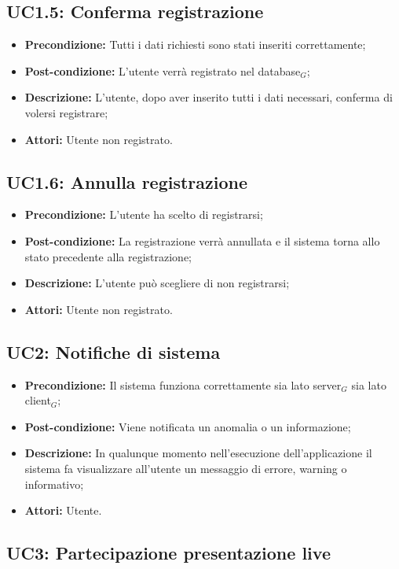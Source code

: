 \subsection{ UC1.5: Conferma registrazione}

\begin{itemize}
	\item \textbf{Precondizione:} Tutti i dati richiesti sono stati inseriti correttamente;
	\item \textbf{Post-condizione:} L'utente verrà registrato nel database$_G$;
	\item \textbf{Descrizione:} L'utente, dopo aver inserito tutti i dati necessari, conferma di volersi registrare;
	\item \textbf{Attori:} Utente non registrato.
\end{itemize}
\subsection{ UC1.6: Annulla registrazione}

\begin{itemize}
	\item \textbf{Precondizione:} L'utente ha scelto di registrarsi;
	\item \textbf{Post-condizione:} La registrazione verrà annullata e il sistema torna allo stato precedente alla registrazione;
	\item \textbf{Descrizione:} L'utente può scegliere di non registrarsi;
	\item \textbf{Attori:} Utente non registrato.
\end{itemize}
\subsection{ UC2: Notifiche di sistema}

\begin{itemize}
	\item \textbf{Precondizione:} Il sistema funziona correttamente sia lato server$_G$ sia lato client$_G$;
	\item \textbf{Post-condizione:} Viene notificata un anomalia o un informazione;
	\item \textbf{Descrizione:} In qualunque momento nell'esecuzione dell'applicazione il sistema fa visualizzare all'utente un messaggio di errore, warning o informativo;
	\item \textbf{Attori:} Utente.
\end{itemize}
\subsection{ UC3: Partecipazione presentazione live}

